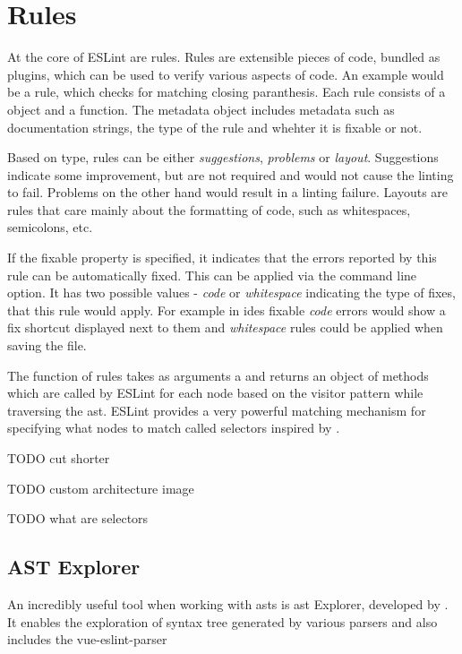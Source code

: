 \section{Rules}
At the core of ESLint are rules. Rules are extensible pieces of code, bundled as plugins, which can be used to verify various aspects of code. An example would be a rule, which checks for matching closing paranthesis. 
Each rule consists of a  object
and a  function. The metadata object includes metadata such as documentation strings, the type of the rule and whehter it is fixable or not.

Based on type, rules can be either \textit{suggestions}, \textit{problems} or \textit{layout}. Suggestions indicate some improvement, but are not required and would not cause the linting to fail. Problems on the other hand would result in a linting failure. Layouts are rules that care mainly about the formatting of code, such as whitespaces, semicolons, etc. 

If the fixable property is specified, it indicates that the errors reported by this rule can be automatically fixed. This can be applied via the  command line option. It has two possible values - \textit{code} or \textit{whitespace} indicating the type of fixes, that this rule would apply. For example in \glspl{ide} fixable \textit{code} errors would show a fix shortcut displayed next to them and \textit{whitespace} rules could be applied when saving the file.

The  function of rules takes as arguments a  and returns an object of methods which are called by ESLint for each node based on the \gls{visitor} pattern while traversing the \gls{ast}. ESLint provides a very powerful matching mechanism for specifying what nodes to match called selectors \parencite{eslintSelectors} inspired by \textcite{estoolsEsQuery}. 

TODO cut shorter 


TODO custom architecture image

TODO what are selectors

\subsection{AST Explorer}
An incredibly useful tool when working with \glspl{ast} is \gls{ast} Explorer, developed by \textcite{astexplorer_fkling2021Jan}. It enables the exploration of syntax tree generated by various parsers and also includes the vue-eslint-parser \parencite{eslint_vue_parser}

